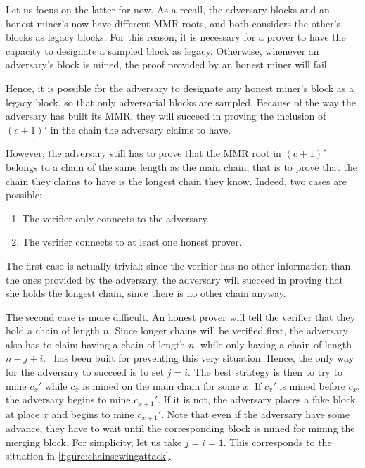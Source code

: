       Let us focus on the latter for now. As a recall, the adversary blocks and an honest miner's now have different MMR roots, and both considers the other's blocks as legacy blocks. For this reason, it is necessary for a prover to have the capacity to designate a sampled block as legacy. Otherwise, whenever an adversary's block is mined, the proof provided by an honest miner will fail.
      
      Hence, it is possible for the adversary to designate any honest miner's block as a legacy block, so that only adversarial blocks are sampled. Because of the way the adversary has built its MMR, they will succeed in proving the inclusion of \((c+1)'\) in the chain the adversary claims to have.
      
      However, the adversary still has to prove that the MMR root in \((c+1)'\) belongs to a chain of the same length as the main chain, that is to prove that the chain they claims to have is the longest chain they know. Indeed, two cases are possible:
      
      \begin{enumerate}
      \item The verifier only connects to the adversary.
      \item The verifier connects to at least one honest prover.
      \end{enumerate}
      
      The first case is actually trivial: since the verifier has no other information than the ones provided by the adversary, the adversary will succeed in proving that she holds the longest chain, since there is no other chain anyway.
      
      The second case is more difficult. An honest prover will tell the verifier that they hold a chain of length \(n\). Since longer chains will be verified first, the adversary also has to claim having a chain of length \(n\), while only having a chain of length \(n-j+i\). \FC\ has been built for preventing this very situation. Hence, the only way for the adversary to succeed is to set \(j=i\). The best strategy is then to try to mine \(c_x'\) while \(c_x\) is mined on the main chain for some \(x\). If \(c_x'\) is mined before \(c_x\), the adversary begins to mine \(c_{x+1}'\). If it is not, the adversary places a fake block at place \(x\) and begins to mine \(c_{x+1}'\). Note that even if the adversary have some advance, they have to wait until the corresponding block is mined for mining the merging block. For simplicity, let us take \(j=i=1\). This corresponds to the situation in \autoref{figure:chainsewingattack}.
      
